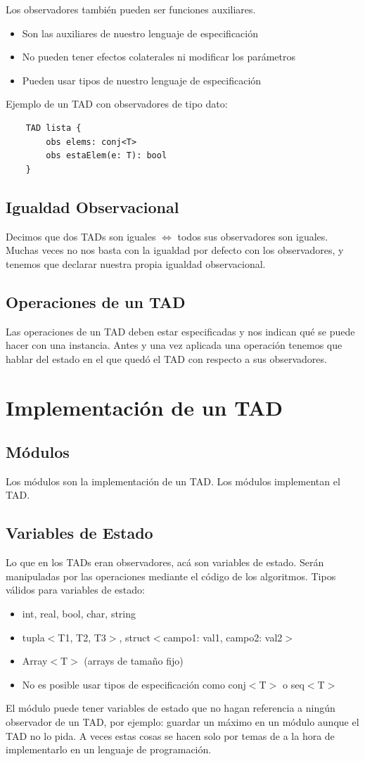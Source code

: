 \documentclass[10pt,a4paper]{article}
\begin{document}
Los observadores también pueden ser funciones auxiliares.
\begin{itemize}
    \item Son las auxiliares de nuestro lenguaje de especificación 
    \item No pueden tener efectos colaterales ni modificar los parámetros
    \item Pueden usar tipos de nuestro lenguaje de especificación 
\end{itemize} 
Ejemplo de un TAD con observadores de tipo dato:
\begin{lstlisting}
    TAD lista {
        obs elems: conj<T>
        obs estaElem(e: T): bool
    }
\end{lstlisting}

\subsection*{Igualdad Observacional}
Decimos que dos TADs son iguales \(\iff\) todos sus observadores son iguales.\\
Muchas veces no nos basta con la igualdad por defecto con los observadores, y tenemos que declarar nuestra propia igualdad observacional.

\subsection*{Operaciones de un TAD}
Las operaciones de un TAD deben estar especificadas y nos indican qué se puede hacer con una instancia.
Antes y una vez aplicada una operación tenemos que hablar del estado en el que quedó el TAD con respecto a sus observadores.
\section*{Implementación de un TAD}
\subsection*{Módulos}
Los módulos son la implementación de un TAD. Los módulos implementan el TAD.
\subsection*{Variables de Estado}
Lo que en los TADs eran observadores, acá son variables de estado. Serán manipuladas por las operaciones mediante el código de los algoritmos. 
Tipos válidos para variables de estado: 
\begin{itemize}
    \item int, real, bool, char, string
    \item tupla\(<\)T1, T2, T3\(>\), struct\(<\)campo1: val1, campo2: val2\(>\)
    \item Array\(<\)T\(>\) (arrays de tamaño fijo)
    \item No es posible usar tipos de especificación como conj\(<\)T\(>\) o seq\(<\)T\(>\)
\end{itemize}
El módulo puede tener variables de estado que no hagan referencia a ningún observador de un TAD, por ejemplo: guardar un máximo en un módulo aunque el TAD no lo pida. A veces estas cosas se hacen solo por temas de a la hora de implementarlo en un lenguaje de programación.
\end{document}
